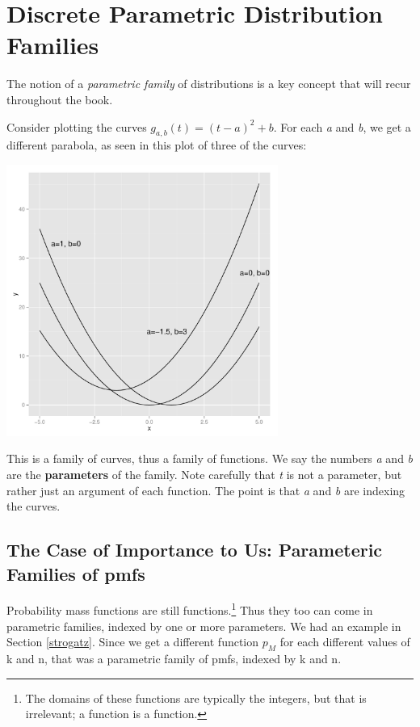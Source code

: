 \chapter{Discrete Parametric Distribution Families}
\label{dispar}

The notion of a {\it parametric family} of distributions 
is a key concept that will recur throughout the book.

Consider plotting the curves $g_{a,b}(t) = (t-a)^2 + b$.  For each {\it
a} and {\it b}, we get a different parabola, as seen in this plot of
three of the curves:


\includegraphics[width=3.5in]{Parabs.pdf}

This is a family of curves, thus a family of functions.  We say the
numbers {\it a} and {\it b} are the {\bf parameters} of the family.
Note carefully that {\it t} is not a parameter, but rather just an
argument of each function.  The point is that {\it a} and {\it b} are
indexing the curves.

\section{The Case of Importance to Us:  Parameteric Families of pmfs}

Probability mass functions are still functions.\footnote{The domains of
these functions are typically the integers, but that is irrelevant; a
function is a function.}  Thus they too can come in parametric families,
indexed by one or more parameters.  We had an example in Section
\ref{strogatz}.  Since we get a different function $p_M$ for each
different values of k and n, that was a parametric family of pmfs,
indexed by k and n.

